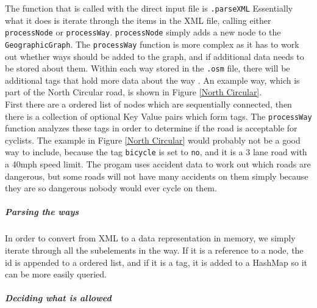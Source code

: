 \documentclass[11pt,twoside,a4paper]{article}
\begin{document}
The function that is called with the direct input file is \texttt{.parseXML} 
Essentially what it does is iterate through the items in the XML file, calling either \texttt{processNode} or \texttt{processWay}. \texttt{processNode} simply adds a new node to the \texttt{GeographicGraph}.
The \texttt{processWay} function is more complex as it has to work out whether ways should be added to the graph, and if additional data needs to be stored about them. Within each way stored in the \texttt{.osm} file,
there will be additional tags that hold more data about the way \cite{osmhighwayspage}. An example way, which is part of the North Circular road, is shown in Figure \ref{North Circular}.\\
First there are a ordered list of nodes which are sequentially connected, then there is a collection of optional Key Value pairs which form tags. The \texttt{processWay}
function analyzes these tags in order to determine if the road is acceptable for cyclists. The example in Figure  \ref{North Circular}
would probably not be a good way to include, because the tag \texttt{bicycle} is set to \texttt{no}, and it is a 3 lane road with a 40mph speed limit. The progam uses 
accident data to work out which roads are dangerous, but some roads will not have many accidents on them simply because they are so dangerous nobody would ever cycle on them. 
\subparagraph{Parsing the ways}
In order to convert from XML to a data representation in memory, we simply iterate through all the subelements in the way. If it is a reference to a node, the id is appended to a ordered list,
and if it is a tag, it is added to a HashMap so it can be more easily queried. 
\subparagraph{Deciding what is allowed}
\end{document}
